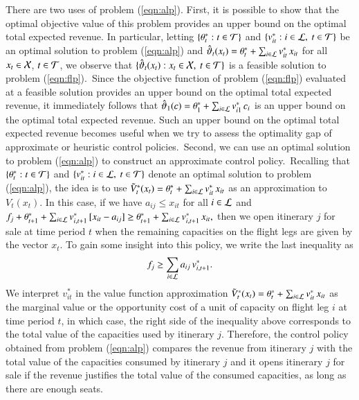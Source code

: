There are two uses of problem (\ref{eqn:alp}). First, it is possible to show that the optimal objective value of this problem provides an upper bound on the optimal total expected revenue. In particular, letting $\{ \theta^*_t : t \in {\cal T}\}$ and $\{ v^*_{it}:  i \in {\cal L},~ t \in {\cal T}\}$ be an optimal solution to problem (\ref{eqn:alp}) and  ${\hat \vartheta}_t(x_t) = \theta^*_t + \sum_{i \in {\cal L}} v^*_{it} {\,} x_{it}$ for all $x_t \in {\cal X}$, $t \in {\cal T}$, we observe that $\{ \hat \vartheta_t(x_t) :  x_t \in {\cal X},~ t \in {\cal T}\}$ is a feasible solution to problem (\ref{eqn:flp}).~Since the objective function of problem (\ref{eqn:flp}) evaluated at a feasible solution provides an upper bound on the optimal total expected revenue, it immediately follows that $\hat \vartheta_1(c) = \theta^*_1 + \sum_{i \in {\cal L}} v^*_{i1} {\,} c_i$ is an upper bound on the optimal total expected revenue. Such an upper bound on the optimal total expected revenue becomes useful when we try to assess the optimality gap of approximate or heuristic control policies.~Second, we can use an optimal solution to problem (\ref{eqn:alp}) to construct an approximate control policy.~Recalling that $\{ \theta^*_t : t \in {\cal T}\}$ and $\{ v^*_{it}: i \in {\cal L},~ t \in {\cal T}\}$ denote an optimal solution to problem (\ref{eqn:alp}), the idea is to use ${\tilde V}_t^*(x_t) = \theta^*_t + \sum_{i \in {\cal L}} v^*_{it} {\,} x_{it}$ as an approximation to $V_t(x_t)$. In this case, if we have $a_{ij} \leq x_{it}$ for all $i \in {\cal L}$ and $f_j + \theta^*_{t+1} + \sum_{i \in {\cal L}} v^*_{i,t+1} {\,} [x_{it} - a_{ij}] \geq \theta^*_{t+1} + \sum_{i \in {\cal L}} v^*_{i,t+1} {\,} x_{it},$ then we open itinerary $j$ for sale at time period $t$ when the remaining capacities on the flight legs are given by the vector $x_t$. To gain some insight into this policy, we write the last inequality as
%
%
\begin{align*}
f_j \geq \sum_{i \in {\cal L}} a_{ij} {\,} v^*_{i,t+1}.
\end{align*}
%
%
We interpret $v^*_{it}$ in the value function approximation ${\tilde V}_t^*(x_t) = \theta^*_t + \sum_{i \in {\cal L}} v^*_{it} {\,} x_{it}$ as the marginal value or the opportunity cost of a unit of capacity on flight leg $i$ at time period $t$, in which case, the right side of the inequality above corresponds to the total value of the capacities used by itinerary $j$. Therefore, the control policy obtained from problem (\ref{eqn:alp}) compares the revenue from itinerary $j$ with the total value of the capacities consumed by itinerary $j$ and it opens itinerary $j$ for sale if the revenue justifies the total value of the consumed capacities, as long as there are enough seats. 


